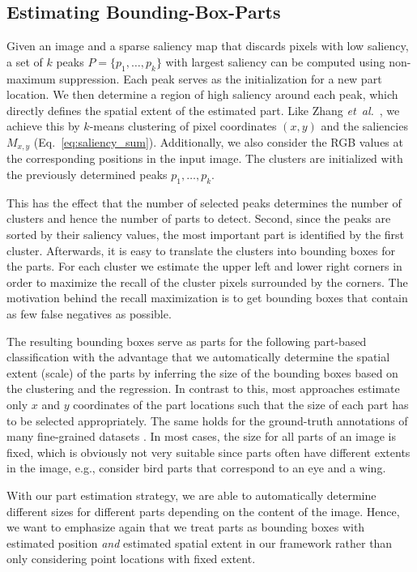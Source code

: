 \documentclass[runningheads]{llncs}
\newcommand{\etal}{\emph{et~al.}}
\begin{document}
\subsection{Estimating Bounding-Box-Parts}
\label{sub:bb_estimation}

Given an image and a sparse saliency map that discards pixels with low saliency, a set of $k$ peaks $P = \{p_1, \dots, p_k\}$ with largest saliency can be computed using non-maximum suppression.
Each peak serves as the initialization for a new part location.
We then determine a region of high saliency around each peak, which directly defines the spatial extent of the estimated part.
Like Zhang \etal~\cite{zhang2019unsupervised}, we achieve this by \mbox{$k$-means} clustering of pixel coordinates $(x, y)$ and the saliencies $M_{x,y}$ (Eq.~\ref{eq:saliency_sum}).
Additionally, we also consider the RGB values at the corresponding positions in the input image.
The clusters are initialized with the previously determined peaks $p_1, \dots, p_k$.

This has the effect that the number of selected peaks determines the number of clusters and hence the number of parts to detect.
Second, since the peaks are sorted by their saliency values, the most important part is identified by the first cluster.
Afterwards, it is easy to translate the clusters into bounding boxes for the parts.
For each cluster we estimate the upper left and lower right corners in order to maximize the recall of the cluster pixels surrounded by the corners.
The motivation behind the recall maximization is to get bounding boxes that contain as few false negatives as possible.

The resulting bounding boxes serve as parts for the following part-based classification with the advantage that we automatically determine the spatial extent (scale) of the parts by inferring the size of the bounding boxes based on the clustering and the regression.
In contrast to this, most approaches estimate only $x$ and $y$ coordinates of the part locations such that the size of each part has to be selected appropriately.
The same holds for the ground-truth annotations of many fine-grained datasets \cite{NABirds,CUB_200_2011}.
In most cases, the size for all parts of an image is fixed, which is obviously not very suitable since parts often have different extents in the image, e.g., consider bird parts that correspond to an eye and a wing.

With our part estimation strategy, we are able to automatically determine different sizes for different parts depending on the content of the image.
Hence, we want to emphasize again that we treat parts as bounding boxes with estimated position \emph{and} estimated spatial extent in our framework rather than only considering point locations with fixed extent.
\end{document}

